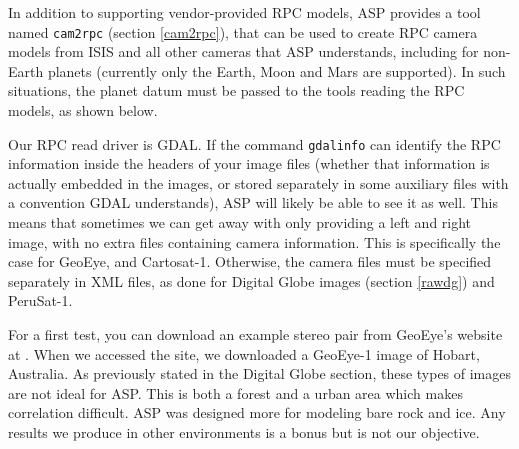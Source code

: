 In addition to supporting vendor-provided RPC models, ASP provides a
tool named \texttt{cam2rpc} (section \ref{cam2rpc}), that can be used to
create RPC camera models from ISIS and all other cameras that ASP
understands, including for non-Earth planets (currently only the Earth, Moon
and Mars are supported). In such situations, the planet datum must be
passed to the tools reading the RPC models, as shown below.

Our RPC read driver is GDAL. If the command \texttt{gdalinfo} can
identify the RPC information inside the headers of your image files (whether
that information is actually embedded in the images, or stored
separately in some auxiliary files with a convention GDAL understands),
ASP will likely be able to see it as well. This means that sometimes we
can get away with only providing a left and right image, with no extra
files containing camera information. This is specifically the case for
GeoEye, and Cartosat-1. Otherwise, the camera files must be specified
separately in XML files, as done for Digital Globe images (section
\ref{rawdg}) and PeruSat-1.

For a first test, you can download an example stereo pair from GeoEye's
website at \cite{geoeye:samples}. When we accessed the site, we
downloaded a GeoEye-1 image of Hobart, Australia. As previously stated
in the Digital Globe section, these types of images are not ideal for
ASP. This is both a forest and a urban area which makes correlation
difficult. ASP was designed more for modeling bare rock and ice. Any
results we produce in other environments is a bonus but is not our
objective.

